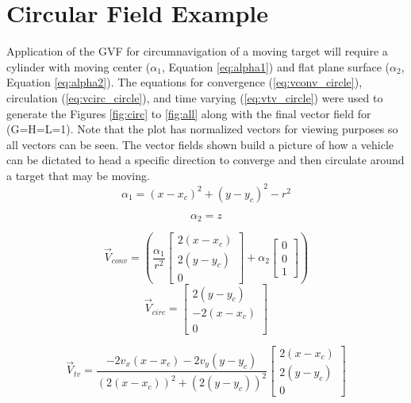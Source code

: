 \documentclass[conf]{new-aiaa}
\begin{document}
\section{Circular Field Example}
Application of the GVF for circumnavigation of a moving target will require a cylinder with moving center ($\alpha_1$, Equation \ref{eq:alpha1}) and flat plane surface ($\alpha_2$, Equation \ref{eq:alpha2}). The equations for convergence (\ref{eq:vconv_circle}), circulation (\ref{eq:vcirc_circle}), and time varying (\ref{eq:vtv_circle}) were used to generate the Figures \ref{fig:circ} to \ref{fig:all} along with the final vector field for (G=H=L=1). Note that the plot has normalized vectors for viewing purposes so all vectors can be seen. The vector fields shown build a picture of how a vehicle can be dictated to head a specific direction to converge and then circulate around a target that may be moving.
\begin{equation}\label{eq:alpha1}
\alpha_1 = (x-x_c)^2 + (y-y_c)^2-r^2
\end{equation}

\begin{equation}\label{eq:alpha2}
\alpha_2 = z
\end{equation}

\begin{equation}\label{eq:vconv_circle}
\overrightarrow{V}_{conv} = \left(\frac{\alpha_1}{r^2} \begin{bmatrix}  2(x-x_c) \\ 2(y-y_c) \\ 0\end{bmatrix} + \alpha_2 \begin{bmatrix}  0 \\ 0 \\ 1 \end{bmatrix}\right)
\end{equation}
\begin{equation}\label{eq:vcirc_circle}
\overrightarrow{V}_{circ} =  \begin{bmatrix}  2(y-y_c) \\ -2(x-x_c) \\ 0\end{bmatrix}
\end{equation}

\begin{equation}\label{eq:vtv_circle}
\overrightarrow{V}_{tv} =  \frac{-2 v_x(x - x_c) - 2 v_y(y - y_c)}{(2(x-x_c))^2+(2(y-y_c))^2} \begin{bmatrix} 2 (x-x_c) \\ 2 (y-y_c) \\ 0 \end{bmatrix}
\end{equation}
\end{document}
